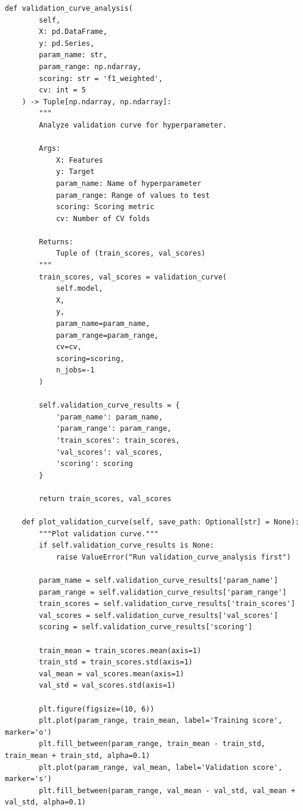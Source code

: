 \begin{lstlisting}[style=python, caption={Production Model Validation Framework}]
    def validation_curve_analysis(
        self,
        X: pd.DataFrame,
        y: pd.Series,
        param_name: str,
        param_range: np.ndarray,
        scoring: str = 'f1_weighted',
        cv: int = 5
    ) -> Tuple[np.ndarray, np.ndarray]:
        """
        Analyze validation curve for hyperparameter.

        Args:
            X: Features
            y: Target
            param_name: Name of hyperparameter
            param_range: Range of values to test
            scoring: Scoring metric
            cv: Number of CV folds

        Returns:
            Tuple of (train_scores, val_scores)
        """
        train_scores, val_scores = validation_curve(
            self.model,
            X,
            y,
            param_name=param_name,
            param_range=param_range,
            cv=cv,
            scoring=scoring,
            n_jobs=-1
        )

        self.validation_curve_results = {
            'param_name': param_name,
            'param_range': param_range,
            'train_scores': train_scores,
            'val_scores': val_scores,
            'scoring': scoring
        }

        return train_scores, val_scores

    def plot_validation_curve(self, save_path: Optional[str] = None):
        """Plot validation curve."""
        if self.validation_curve_results is None:
            raise ValueError("Run validation_curve_analysis first")

        param_name = self.validation_curve_results['param_name']
        param_range = self.validation_curve_results['param_range']
        train_scores = self.validation_curve_results['train_scores']
        val_scores = self.validation_curve_results['val_scores']
        scoring = self.validation_curve_results['scoring']

        train_mean = train_scores.mean(axis=1)
        train_std = train_scores.std(axis=1)
        val_mean = val_scores.mean(axis=1)
        val_std = val_scores.std(axis=1)

        plt.figure(figsize=(10, 6))
        plt.plot(param_range, train_mean, label='Training score', marker='o')
        plt.fill_between(param_range, train_mean - train_std, train_mean + train_std, alpha=0.1)
        plt.plot(param_range, val_mean, label='Validation score', marker='s')
        plt.fill_between(param_range, val_mean - val_std, val_mean + val_std, alpha=0.1)


\end{lstlisting}
